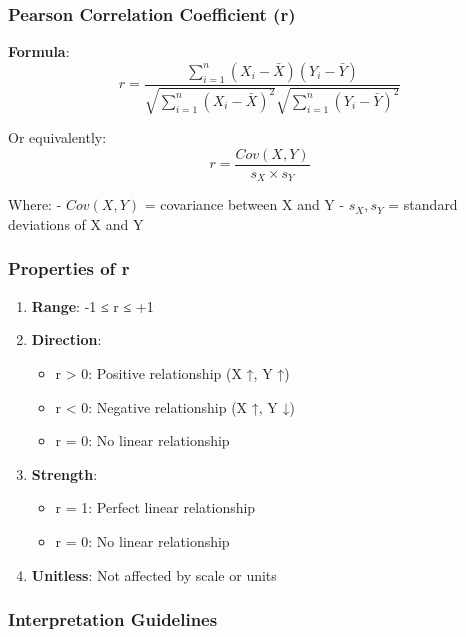 \documentclass[11pt]{article}
\providecommand{\tightlist}{%
      \setlength{\itemsep}{0pt}\setlength{\parskip}{0pt}}
\begin{document}
\subsubsection{Pearson Correlation Coefficient
(r)}\label{pearson-correlation-coefficient-r}

\textbf{Formula}:
\[r = \frac{\sum_{i=1}^{n}(X_i - \bar{X})(Y_i - \bar{Y})}{\sqrt{\sum_{i=1}^{n}(X_i - \bar{X})^2} \sqrt{\sum_{i=1}^{n}(Y_i - \bar{Y})^2}}\]

Or equivalently: \[r = \frac{Cov(X, Y)}{s_X \times s_Y}\]

Where: - \(Cov(X, Y)\) = covariance between X and Y - \(s_X, s_Y\) =
standard deviations of X and Y

\subsubsection{Properties of r}\label{properties-of-r}

\begin{enumerate}
\def\labelenumi{\arabic{enumi}.}
\tightlist
\item
  \textbf{Range}: -1 ≤ r ≤ +1
\item
  \textbf{Direction}:

  \begin{itemize}
  \tightlist
  \item
    r \textgreater{} 0: Positive relationship (X ↑, Y ↑)
  \item
    r \textless{} 0: Negative relationship (X ↑, Y ↓)
  \item
    r = 0: No linear relationship
  \end{itemize}
\item
  \textbf{Strength}:

  \begin{itemize}
  \tightlist
  \item
    \textbar r\textbar{} = 1: Perfect linear relationship
  \item
    \textbar r\textbar{} = 0: No linear relationship
  \end{itemize}
\item
  \textbf{Unitless}: Not affected by scale or units
\end{enumerate}

\subsubsection{Interpretation
Guidelines}\label{interpretation-guidelines}
\end{document}

